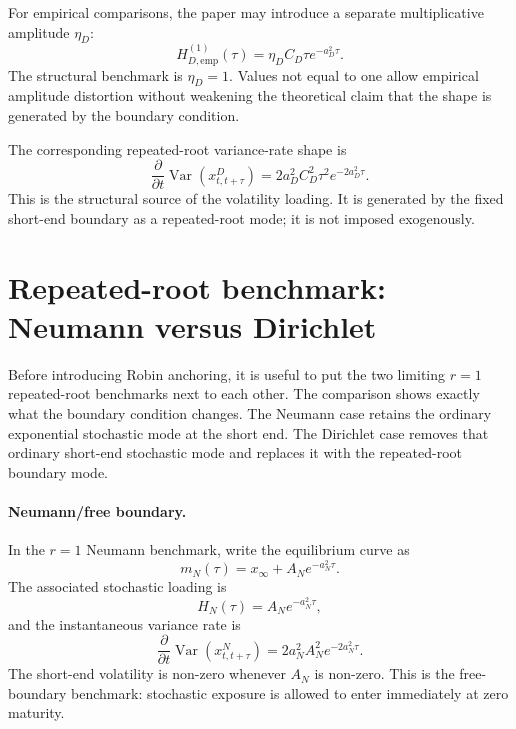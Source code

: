 \documentclass[11pt]{article}
\newcommand{\Var}{\operatorname{Var}}
\numberwithin{equation}{section}
\begin{document}
For empirical comparisons, the paper may introduce a separate multiplicative amplitude $\eta_D$:
\begin{equation}
H_{D,\mathrm{emp}}^{(1)}(\tau)=\eta_D C_D\tau e^{-a_D^2\tau}.
\end{equation}
The structural benchmark is $\eta_D=1$. Values not equal to one allow empirical amplitude distortion without weakening the theoretical claim that the shape is generated by the boundary condition.

The corresponding repeated-root variance-rate shape is
\begin{equation}
\frac{\partial}{\partial t}\Var(x^D_{t,t+\tau})
=
2a_D^2 C_D^2\tau^2 e^{-2a_D^2\tau}.
\end{equation}
This is the structural source of the volatility loading. It is generated by the fixed short-end boundary as a repeated-root mode; it is not imposed exogenously.

\section{Repeated-root benchmark: Neumann versus Dirichlet}

Before introducing Robin anchoring, it is useful to put the two limiting $r=1$ repeated-root benchmarks next to each other. The comparison shows exactly what the boundary condition changes. The Neumann case retains the ordinary exponential stochastic mode at the short end. The Dirichlet case removes that ordinary short-end stochastic mode and replaces it with the repeated-root boundary mode.

\paragraph{Neumann/free boundary.}
In the $r=1$ Neumann benchmark, write the equilibrium curve as
\begin{equation}
m_N(\tau)=x_\infty+A_Ne^{-a_N^2\tau}.
\end{equation}
The associated stochastic loading is
\begin{equation}
H_N(\tau)=A_Ne^{-a_N^2\tau},
\end{equation}
and the instantaneous variance rate is
\begin{equation}
\frac{\partial}{\partial t}\Var(x^N_{t,t+\tau})=2a_N^2A_N^2e^{-2a_N^2\tau}.
\end{equation}
The short-end volatility is non-zero whenever $A_N$ is non-zero. This is the free-boundary benchmark: stochastic exposure is allowed to enter immediately at zero maturity.
\end{document}
